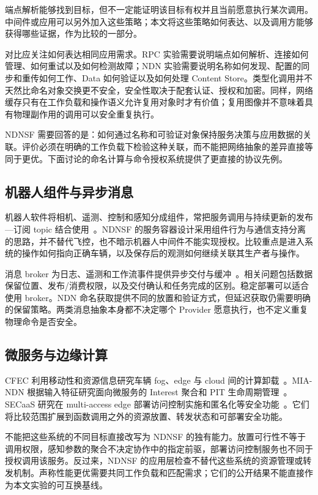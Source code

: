端点解析能够找到目标，但不一定能证明该目标有权并且当前愿意执行某次调用。中间件或应用可以另外加入这些策略；本文将这些策略如何表达、以及调用方能够获得哪些证据，作为比较的一部分。

对比应关注如何表达相同应用需求。RPC 实验需要说明端点如何解析、连接如何管理、如何重试以及如何检测故障；NDN 实验需要说明名称如何发现、配置的同步和重传如何工作、Data 如何验证以及如何处理 Content Store。类型化调用并不天然比命名对象交换更不安全，安全性取决于配套认证、授权和加密。同样，网络缓存只有在工作负载和操作语义允许复用对象时才有价值；复用图像并不意味着具有物理副作用的调用可以安全重复执行。

NDNSF 需要回答的是：如何通过名称和可验证对象保持服务决策与应用数据的关联。评价必须在明确的工作负载下检验这种关联，而不能把网络抽象的差异直接等同于更优。下面讨论的命名计算与命令授权系统提供了更直接的协议先例。

\subsection{机器人组件与异步消息}
机器人软件将相机、遥测、控制和感知分成组件，常把服务调用与持续更新的发布—订阅 topic 结合使用~\cite{ros,ros2}。NDNSF 的服务容器设计采用组件行为与通信支持分离的思路，并不替代飞控，也不暗示机器人中间件不能实现授权。比较重点是进入系统的操作如何指向正确车辆，以及保存后的观测如何继续关联其生产者与操作。

消息 broker 为日志、遥测和工作流事件提供异步交付与缓冲~\cite{messagequeue}。相关问题包括数据保留位置、发布/消费权限，以及交付确认和任务完成的区别。稳定部署可以适合使用 broker。NDN 命名获取提供不同的放置和验证方式，但延迟获取仍需要明确的保留策略。两类消息抽象本身都不决定哪个 Provider 愿意执行，也不定义重复物理命令是否安全。

\subsection{微服务与边缘计算}
CFEC 利用移动性和资源信息研究车辆 fog、edge 与 cloud 间的计算卸载~\cite{cfec}。MIA-NDN 根据输入特征研究面向微服务的 Interest 聚合和 PIT 生命周期管理~\cite{miandn}。SECaaS 研究在 multi-access edge 部署访问控制实施和匿名化等安全功能~\cite{secaas}。它们将比较范围扩展到函数调用之外的资源放置、转发状态和可部署安全功能。

不能把这些系统的不同目标直接改写为 NDNSF 的独有能力。放置可行性不等于调用权限，感知参数的聚合不决定协作中的指定前驱，部署访问控制服务也不同于授权调用该服务。反过来，NDNSF 的应用层检查不替代这些系统的资源管理或转发机制。声称性能更优需要共同工作负载和匹配需求；它们的公开结果不能直接作为本文实验的可互换基线。
